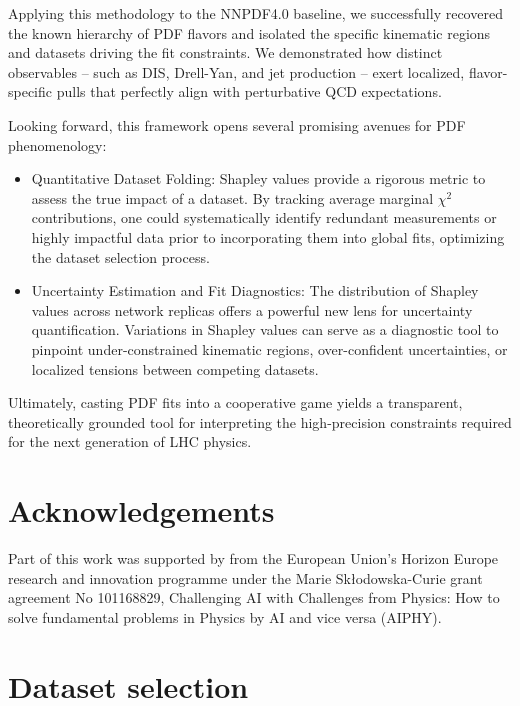 \documentclass[11pt,a4paper]{article}
\begin{document}
Applying this methodology to the NNPDF4.0 baseline, we successfully recovered the known hierarchy of PDF flavors and isolated the specific kinematic regions and datasets driving the fit constraints. We demonstrated how distinct observables -- such as DIS, Drell-Yan, and jet production -- exert localized, flavor-specific pulls that perfectly align with perturbative QCD expectations.

Looking forward, this framework opens several promising avenues for PDF phenomenology:
\begin{itemize}
    
\item Quantitative Dataset Folding: Shapley values provide a rigorous metric to assess the true impact of a dataset. By tracking average marginal $\chi^2$ contributions, one could systematically identify redundant measurements or highly impactful data prior to incorporating them into global fits, optimizing the dataset selection process.
\item Uncertainty Estimation and Fit Diagnostics: The distribution of Shapley values across network replicas offers a powerful new lens for uncertainty quantification. Variations in Shapley values can serve as a diagnostic tool to pinpoint under-constrained kinematic regions, over-confident uncertainties, or localized tensions between competing datasets.
\end{itemize}

Ultimately, casting PDF fits into a cooperative game yields a transparent, theoretically grounded tool for interpreting the high-precision constraints required for the next generation of LHC physics.

\section*{Acknowledgements}

Part of this work was supported by from the European Union’s Horizon Europe research and innovation programme under the Marie Sk\l{}odowska-Curie grant agreement No 101168829, Challenging AI with Challenges from Physics: How to solve fundamental problems in Physics by AI and vice versa (AIPHY).

\clearpage
\appendix


\section{Dataset selection}
\label{app:datasets}
\end{document}
